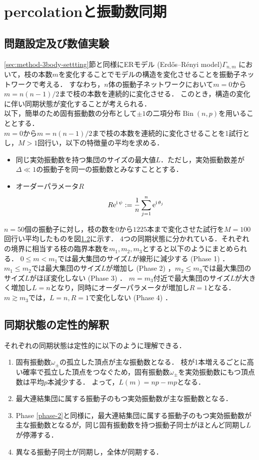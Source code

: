 \documentclass[../main]{subfiles}
\begin{document}
\chapter{percolationと振動数同期}
\label{chap:percolation}
\section{問題設定及び数値実験}
\ref{sec:method-3body-settting}節と同様にERモデル (Erdős–Rényi model)$\Gamma_{n,m}$ において，枝の本数$m$を変化することでモデルの構造を変化させることを振動子ネットワークで考える．
すなわち，$n$体の振動子ネットワークにおいて$m=0$から$m=n(n-1)/2$まで枝の本数を連続的に変化させる．
このとき，構造の変化に伴い同期状態が変化することが考えられる．\\
以下，簡単のため固有振動数の分布として$\pm 1$の二項分布$\operatorname{Bin}(n,p)$を用いることとする．\\
$m=0$から$m=n(n-1)/2$まで枝の本数を連続的に変化させることを1試行とし，$M>1$回行い，以下の特徴量の平均を求める．
\begin{itemize}
    \item 
    同じ実効振動数を持つ集団のサイズの最大値$L$．ただし，実効振動数差が$\Delta\ll 1$の振動子を同一の振動数とみなすこととする．
    \item
    オーダーパラメータ$R$
    \begin{align*}
        R\mathrm{e}^{{\mathrm i\,} \psi}:=\frac{1}{n}\sum_{j=1}^n\mathrm{e}^{{\mathrm i\,} \theta_j}    
    \end{align*}
\end{itemize}
$n=50$個の振動子に対し，枝の数を$0$から$1225$本まで変化させた試行を$M=100$回行い平均したものを図\ref{}に示す．
4つの同期状態に分かれている．それぞれの境界に相当する枝の臨界本数を$m_1,m_2,m_3$とすると以下のようにまとめられる．
$0\leq m<m_1$では最大集団のサイズ$L$が線形に減少する (Phase 1) ．
$m_1\leq m_2$では最大集団のサイズ$L$が増加し (Phase 2) ，$m_2\leq m_3$では最大集団のサイズ$L$がほぼ変化しない (Phase 3) ．
$m=m_3$付近で最大集団のサイズ$L$が大きく増加し$L=n$となり，同時にオーダーパラメータが増加し$R=1$となる．$m\gtrsim m_3$では，$L=n,R=1$で変化しない (Phase 4) ．
\section{同期状態の定性的解釈}
それぞれの同期状態は定性的に以下のように理解できる．
\renewcommand{\labelenumi}{Phase \theenumi}
\begin{enumerate}
    \item 固有振動数$\omega_\pm$の孤立した頂点が主な振動数となる．
    枝が1本増えるごとに高い確率で孤立した頂点をつなぐため，固有振動数$\omega_\pm$を実効振動数にもつ頂点数は平均$p$本減少する．
    よって，$L(m)=np-mp$となる．
    \item \label{phase-2}最大連結集団に属する振動子のもつ実効振動数が主な振動数となる．
    \item Phase \ref{phase-2}と同様に，最大連結集団に属する振動子のもつ実効振動数が主な振動数となるが，同じ固有振動数を持つ振動子同士がほとんど同期し$L$が停滞する．
    \item 異なる振動子同士が同期し，全体が同期する．
\end{enumerate}
\end{document}
